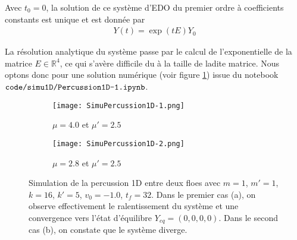 \noindent Avec $t_0= 0$, la solution de ce système d'EDO du premier ordre à coefficients constants est unique et est donnée par
\begin{align}
    Y(t) = \exp(tE)Y_0
\end{align}

La résolution analytique du système passe par le calcul de l'exponentielle de la matrice $E \in \mathbb{R}^4$, ce qui s'avère difficile du à la taille de ladite matrice. Nous optons donc pour une solution numérique (voir figure \cref{fig:simucontact1dun}) issue du notebook $\verb|code/simu1D/Percussion1D-1.ipynb|$.
\begin{figure*}[!h]
    \centering

    \begin{subfigure}[t]{0.48\textwidth}
        \centering
        \texttt{[image: SimuPercussion1D-1.png]}
        \caption{$\mu= 4.0$ et $\mu' = 2.5$ }
        \label{fig:simucontact1dun}
    \end{subfigure}
    \begin{subfigure}[t]{0.48\textwidth}
        \centering
        \texttt{[image: SimuPercussion1D-2.png]}
        \caption{$\mu= 2.8$ et $\mu' = 2.5$ }
        \label{fig:simucontact1ddeux}
    \end{subfigure}
    \caption{Simulation de la percussion 1D entre deux floes avec $m=1$, $m'=1$, $k=16$, $k'=5$, $v_0=-1.0$, $t_{f}=32$. Dans le premier cas (a), on observe effectivement le ralentissement du système et une convergence
    vers l'état d'équilibre $Y_{eq}= (0,0,0,0)$. Dans le second cas (b), on constate que le système diverge.}
    \label{fig:simucontact1d}
\end{figure*}




